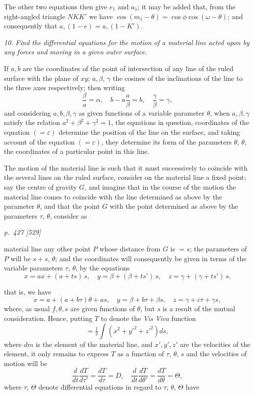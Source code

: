 \documentclass[11pt,a4paper]{book}
\begin{document}
The other two equations then give $e_1$ and $a_1$; it may be added that, from the
right-angled triangle $NKK'$ we have $\cos(m_1 - \theta) = \cos\phi\cos(\omega - \theta)$; and consequently
that $a, (1 - e) = a, (1 - K')$.

\textit{10. Find the differential equations for the motion of a material line acted upon by any forces and moving in a given outer surface.}

If $a, b$ are the coordinates of the point of intersection of any line of the ruled
surface with the plane of $xy$; $a, \beta$, $\gamma$ the cosines of the inclinations of the line to
the three axes respectively; then writing
\[
\frac{\beta}{a} = \alpha,\quad b - a\frac{a}{\beta} = b,\quad \frac{\gamma}{\beta} = \gamma,
\]
and considering $a, b, \beta, \gamma$ as given functions of a variable parameter $\theta$, when
$a, \beta, \gamma$ satisfy the relation $a^2 + \beta^2 + \gamma^2 = 1$, the equations in question, coordinates of the
equation $(=\varepsilon)$ determine the position of the line on the surface, and taking account of the
equation $(=\varepsilon)$, they determine its form of the parameters $\theta$, $\theta$, the coordinates of a
particular point in this line.

The motion of the material line is such that it must successively to coincide with
the several lines on the ruled surface, consider on the material line a fixed point;
say the centre of gravity $G$, and imagine that in the course of the motion the material
line comes to coincide with the line determined as above by the parameter $\theta$, and that
the point $G$ with the point determined as above by the parameters $\tau$, $\theta$, consider as
\clearpage

\bigskip
\textit{p.~427 [529]}
\smallskip

material line any other point $P$ whose distance from $G$ is $= s$; the parameters of $P$
will be $s + s$, $\theta$; and the coordinates will consequently be given in terms of the variable
parameters $\tau$, $\theta$, by the equations
\[
x = ax + (a + ts)\,s,\quad y = \beta + (\beta + ts')\,s,\quad z = \gamma + (\gamma + ts')\,s.
\]

that is, we have
\[
x = a + (a + b\tau)\theta + as,\quad y = \beta + b\tau + \beta s,\quad z = \gamma + c\tau + \gamma s,
\]
where, as usual $f, \theta, s$ are given functions of $\theta$, but $s$ is a result of the mutual
consideration. Hence, putting $T$ to denote the \textit{Vis Viva} function
\[
= \tfrac{1}{2}\int (x^2 + y'^2 + z'^2) ds,
\]
where $dm$ is the element of the material line, and $x', y', z'$ are the velocities of the
element, it only remains to express $T$ as a function of $\tau$, $\theta$, $s$ and the velocities of
motion will be
\[
\frac{d}{dt}\frac{dT}{d\tau'} = \frac{dT}{d\tau} = D,\quad \frac{d}{dt}\frac{dT}{d\theta'} = \frac{dT}{d\theta} = \Theta,
\]
where $\tau$, $\Theta$ denote differential equations in regard to $\tau$, $\theta$, $\Theta$ have
\end{document}
